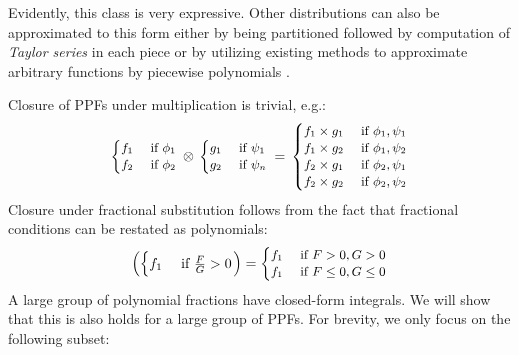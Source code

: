 \documentclass[letterpaper]{article}
\newcommand{\case}[2]{#2 &\text{ if } #1}%
\begin{document}
Evidently, this class is very expressive. 
Other distributions can also be approximated to this form either by being partitioned 
followed by computation of \emph{Taylor series} in each piece or by utilizing existing methods 
to approximate arbitrary functions by piecewise polynomials \cite{shenoy2011inference}.

Closure of PPFs under multiplication is trivial, e.g.:
\begin{equation*}
\footnotesize
  \begin{cases}
  \case{\phi_1}{f_1}\\
  \case{\phi_2}{f_2}    
  \end{cases}
\,
 \otimes
\,
  \begin{cases}
  \case{\psi_1}{g_1} \\
  \case{\psi_n}{g_2} 
  \end{cases}
 \, = \,
\begin{cases}
  \case{\phi_1, \psi_1}{f_1 \times g_1} \\ 
  \case{\phi_1, \psi_2}{f_1 \times g_2} \\
  \case{\phi_2, \psi_1}{f_2 \times g_1} \\
  \case{\phi_2, \psi_2}{f_2 \times g_2}
  \end{cases}
\end{equation*} 
Closure under fractional substitution follows from the fact that 
fractional conditions can be restated as polynomials:
\begin{align*}
\left(
 \begin{cases}
  \case{\frac{F}{G} > 0}{f_1} \\ 
 \end{cases} 
\right)
 =
{\footnotesize
\begin{cases}
  \case{F > 0, G > 0 }{f_1} \\ 
  \case{F \leq 0, G \leq 0}{f_1} \\ 
 \end{cases} 
}
\end{align*}
A large group of polynomial fractions have closed-form integrals. 
We will show that this is also holds for a large group of PPFs.
For brevity, we only focus on the following subset:
\end{document}
